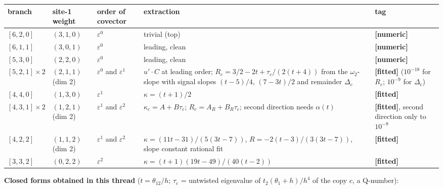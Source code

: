\documentclass[10pt]{article}
\begin{document}
\begin{center}\footnotesize\setlength{\tabcolsep}{3pt}\begin{longtable}{@{}p{2.3cm}p{1.8cm}p{2.5cm}p{6.2cm}p{2.4cm}@{}}\toprule
\textbf{branch} & \textbf{site-1 weight} & \textbf{order of covector} & \textbf{extraction} & \textbf{tag} \\\midrule\endhead
$[6,2,0]$ & $(3,1,0)$ & $\varepsilon^0$ & trivial (top) & \textbf{[numeric]} \\
$[6,1,1]$ & $(3,0,1)$ & $\varepsilon^0$ & leading, clean & \textbf{[numeric]} \\
$[5,3,0]$ & $(2,2,0)$ & $\varepsilon^0$ & leading, clean & \textbf{[numeric]} \\
$[5,2,1]\times2$ & $(2,1,1)$ (dim 2) & $\varepsilon^0$ and $\varepsilon^1$ & $u'\cdot C$ at leading order; $R_c=3/2-2t+\tau_c/(2(t+4))$ from the $\omega_2$-slope with signal slopes $(t-5)/4$, $(7-3t)/2$ and remainder $\Delta_c$ & \textbf{[fitted]} ($10^{-18}$ for $R_c$; $10^{-9}$ for $\Delta_c$) \\
$[4,4,0]$ & $(1,3,0)$ & $\varepsilon^1$ & $\kappa=(t+1)/2$ & \textbf{[fitted]} \\
$[4,3,1]\times2$ & $(1,2,1)$ (dim 2) & $\varepsilon^1$ and $\varepsilon^2$ & $\kappa_c=A+B\tau_c$; $R_c=A_R+B_R\tau_c$; second direction needs $\alpha(t)$ & \textbf{[fitted]}, second direction only to $10^{-8}$ \\
$[4,2,2]$ & $(1,1,2)$ (dim 2) & $\varepsilon^1$ and $\varepsilon^2$ & $\kappa=(11t-31)/(5(3t-7))$, $R=-2(t-3)/(3(3t-7))$, slope constant rational fit & \textbf{[fitted]} \\
$[3,3,2]$ & $(0,2,2)$ & $\varepsilon^2$ & $\kappa=(t+1)(19t-49)/(40(t-2))$ & \textbf{[fitted]} \\
\bottomrule\end{longtable}\end{center}

\textbf{Closed forms obtained in this thread} ($t=\theta_{12}/h$; $\tau_c$ = untwisted eigenvalue of $t_2(\theta_1+h)/h^4$ of the copy $c$, a Q-number):
\end{document}
